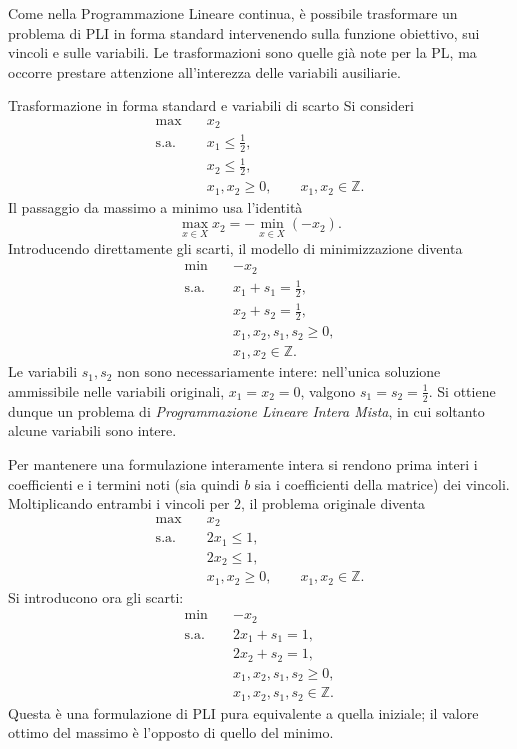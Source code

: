 Come nella Programmazione Lineare continua, è possibile trasformare
un problema di PLI in forma standard intervenendo sulla funzione obiettivo,
sui vincoli e sulle variabili. Le trasformazioni sono quelle già note
per la PL, ma occorre prestare attenzione all'interezza delle variabili
ausiliarie.

\begin{example}{Trasformazione in forma standard e variabili di scarto}
Si consideri
\begin{align*}
\max\quad &x_2\\
\text{s.a.}\quad &x_1\leq\frac12,\\
&x_2\leq\frac12,\\
&x_1,x_2\geq0,\qquad x_1,x_2\in\mathbb Z.
\end{align*}
Il passaggio da massimo a minimo usa l'identità
\[
\max_{x\in X}x_2=-\min_{x\in X}(-x_2).
\]
Introducendo direttamente gli scarti, il modello di minimizzazione diventa
\begin{align*}
\min\quad &-x_2\\
\text{s.a.}\quad &x_1+s_1=\frac12,\\
&x_2+s_2=\frac12,\\
&x_1,x_2,s_1,s_2\geq0,\\
&x_1,x_2\in\mathbb Z.
\end{align*}
Le variabili \(s_1,s_2\) non sono necessariamente intere:
nell'unica soluzione ammissibile nelle variabili originali,
\(x_1=x_2=0\), valgono \(s_1=s_2=\frac12\).
Si ottiene dunque un problema di \emph{Programmazione Lineare
Intera Mista}, in cui soltanto alcune variabili sono intere.

Per mantenere una formulazione interamente intera si rendono prima
interi i coefficienti e i termini noti (sia quindi $b$ sia i coefficienti della matrice) dei vincoli. Moltiplicando
entrambi i vincoli per \(2\), il problema originale diventa
\begin{align*}
\max\quad &x_2\\
\text{s.a.}\quad &2x_1\leq1,\\
&2x_2\leq1,\\
&x_1,x_2\geq0,\qquad x_1,x_2\in\mathbb Z.
\end{align*}
Si introducono ora gli scarti:
\begin{align*}
\min\quad &-x_2\\
\text{s.a.}\quad &2x_1+s_1=1,\\
&2x_2+s_2=1,\\
&x_1,x_2,s_1,s_2\geq0,\\
&x_1,x_2,s_1,s_2\in\mathbb Z.
\end{align*}
Questa è una formulazione di PLI pura equivalente a quella iniziale;
il valore ottimo del massimo è l'opposto di quello del minimo.
\end{example}

